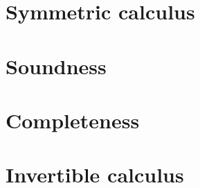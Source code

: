 \begin{scope}
\begin{scope}

\section{Symmetric calculus}



\section{Soundness}



\section{Completeness}



\section{Invertible calculus}





\end{scope}
\end{scope}